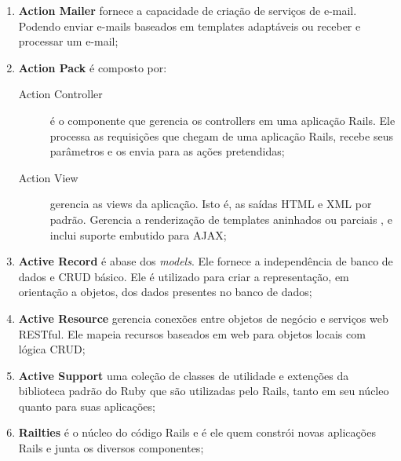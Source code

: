 \begin{enumerate}

	\item \textbf{Action Mailer} fornece a capacidade de criação de serviços de e-mail. Podendo enviar e-mails baseados em templates adaptáveis ou receber e processar um e-mail;

	\item \textbf{Action Pack} é composto por: \\

	\begin{description}
 
	\item [Action Controller] é o componente que gerencia os controllers em uma aplicação Rails. Ele processa as requisições que chegam de uma aplicação Rails, recebe seus
parâmetros e os envia para as ações pretendidas;

	\item [Action View] gerencia as views da aplicação. Isto é, as saídas HTML e XML por 	padrão. Gerencia a renderização de templates aninhados ou parciais , e inclui suporte
embutido para AJAX;

	\end{description}

\item \textbf{Active Record} é abase dos \textit{models}. Ele fornece a independência de banco de dados e CRUD básico. Ele é utilizado para criar a representação, em orientação a objetos, dos
dados presentes no banco de dados;

\item \textbf{Active Resource} gerencia conexões entre objetos de negócio e serviços web RESTful.
Ele mapeia recursos baseados em web para objetos locais com lógica CRUD;

\item \textbf{Active Support} uma coleção de classes de utilidade e extenções da biblioteca padrão do
Ruby que são utilizadas pelo Rails, tanto em seu núcleo quanto para suas aplicações;

\item \textbf{Railties} é o núcleo do código Rails e é ele quem constrói novas aplicações Rails e junta os diversos componentes;

\end{enumerate}
















